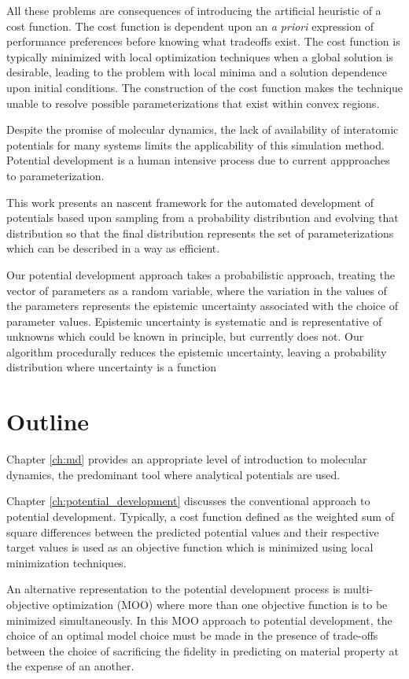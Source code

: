 All these problems are consequences of introducing the artificial heuristic of a cost function.  The cost function is dependent upon an \emph{a priori} expression of performance preferences before knowing what tradeoffs exist.  The cost function is typically minimized with local optimization techniques when a global solution is desirable, leading to the problem with local minima and a solution dependence upon initial conditions.  The construction of the cost function makes the technique unable to resolve possible parameterizations that exist within convex regions.

Despite the promise of molecular dynamics, the lack of availability of interatomic potentials for many systems limits the applicability of this simulation method.  Potential development is a human intensive process due to current appproaches to parameterization.

This work presents an nascent framework for the automated development of potentials based upon sampling from a probability distribution and evolving that distribution so that the final distribution represents the set of parameterizations which can be described in a way as efficient.

Our potential development approach takes a probabilistic approach, treating the vector of parameters as a random variable, where the variation in the values of the parameters represents the epistemic uncertainty associated with the choice of parameter values.  Epistemic uncertainty is systematic and is representative of unknowns which could be known in principle, but currently does not.  Our algorithm procedurally reduces the epistemic uncertainty, leaving a probability distribution where uncertainty is a function

\section{Outline}
Chapter \ref{ch:md} provides an appropriate level of introduction to molecular dynamics, the predominant tool where analytical potentials are used.

Chapter \ref{ch:potential_development} discusses the  conventional approach to potential development.  Typically, a cost function defined as the weighted sum of square differences between the predicted potential values and their respective target values is used as an objective function which is minimized using local minimization techniques.

An alternative representation to the potential development process is multi-objective optimization (MOO) where more than one objective function is to be minimized simultaneously.  In this MOO approach to potential development, the choice of an optimal model choice must be made in the presence of trade-offs between the choice of sacrificing the fidelity in predicting on material property at the expense of an another.

